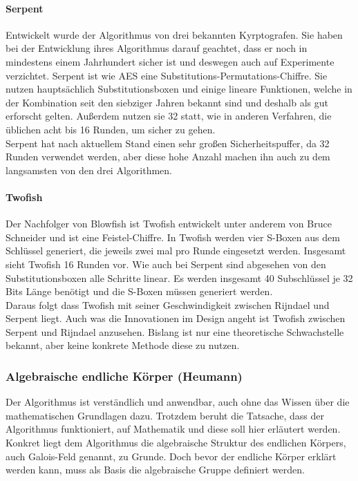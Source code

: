  \paragraph{Serpent}
 Entwickelt wurde der Algorithmus von drei bekannten Kyrptografen. Sie haben bei der Entwicklung ihres
 Algorithmus darauf geachtet, dass er noch in mindestens einem Jahrhundert sicher ist und deswegen auch
 auf Experimente verzichtet. Serpent ist wie AES eine Substitutions-Permutations-Chiffre. Sie nutzen
 hauptsächlich Substitutionsboxen und einige lineare Funktionen, welche
 in der Kombination seit den siebziger Jahren bekannt sind und deshalb als gut erforscht gelten.
 Außerdem nutzen sie 32 statt, wie in anderen Verfahren, die üblichen acht bis 16 Runden, um sicher zu gehen. \\
 Serpent hat nach aktuellem Stand einen sehr großen Sicherheitspuffer, da 32 Runden verwendet werden, aber
 diese hohe Anzahl machen ihn auch zu dem langsamsten von den drei Algorithmen. \cite{schmeh07}
 
 \paragraph{Twofish}
 Der Nachfolger von Blowfish ist Twofish entwickelt unter anderem von Bruce Schneider und ist eine Feistel-Chiffre.
 In Twofish werden vier S-Boxen aus dem
 Schlüssel generiert, die jeweils zwei mal pro Runde eingesetzt werden. Insgesamt sieht Twofish 16 Runden vor.
 Wie auch bei Serpent sind abgesehen von den Substitutionsboxen alle Schritte linear. Es werden insgesamt 40
 Subschlüssel je 32 Bits Länge benötigt und die S-Boxen müssen generiert werden. \\
 Daraus folgt dass Twofish mit seiner Geschwindigkeit zwischen Rijndael und Serpent liegt. Auch was die Innovationen
 im Design angeht ist Twofish zwischen Serpent und Rijndael anzusehen. Bislang ist nur eine theoretische Schwachstelle
 bekannt, aber keine konkrete Methode diese zu nutzen. \cite{schmeh07}
 
 \subsubsection{Algebraische endliche Körper (Heumann)}
 Der Algorithmus ist verständlich und anwendbar, auch ohne das Wissen über die mathematischen
 Grundlagen dazu. Trotzdem beruht die Tatsache, dass der Algorithmus funktioniert, auf Mathematik
 und diese soll hier erläutert werden. Konkret liegt dem Algorithmus die algebraische Struktur des
 endlichen Körpers, auch Galois-Feld genannt, zu Grunde. Doch bevor der endliche Körper
 erklärt werden kann, muss als Basis die algebraische Gruppe definiert werden.
 
